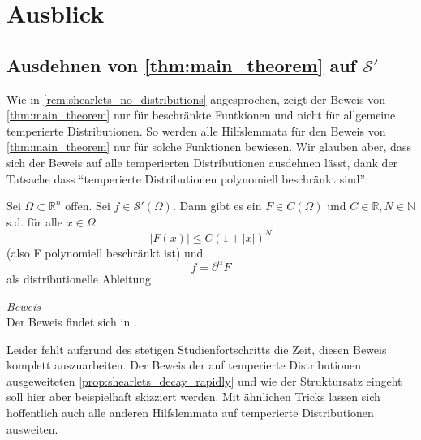 
\section{Ausblick} %
\label{sec:ausblick}

\subsection{\texorpdfstring{Ausdehnen von \cref{thm:main_theorem} auf $\mathcal{S}'$}{Ausdehnen auf Distributionen}} %
\label{sec:ausdehnen_von_thm:main_theorem}
Wie in \cref{rem:shearlets_no_distributions} angesprochen, zeigt der Beweis von \textcite{Kutyniok2008} \cref{thm:main_theorem} nur für beschränkte Funtkionen und nicht für allgemeine temperierte Distributionen. So werden alle Hilfslemmata für den Beweis von \cref{thm:main_theorem} nur für solche Funktionen bewiesen. Wir glauben aber, dass sich der Beweis auf alle temperierten Distributionen ausdehnen lässt, dank der Tatsache dass "`temperierte Distributionen polynomiell beschränkt sind"':

\begin{theorem}
\label{thm:struktursatz}
    Sei $\Omega \subset \mathbb{R}^n$ offen. Sei $f \in \mathcal{S}'(\Omega)$. Dann gibt es ein $F \in C(\Omega)$ und $C \in \mathbb{R}, N \in \mathbb{N}$ s.d. für alle $x \in \Omega$
    \begin{equation*}
        |F(x)| \leq C (1+|x| )^N
    \end{equation*}
    (also F polynomiell beschränkt ist) und
    \begin{equation*}
        f = \partial^\alpha F
    \end{equation*}
    als distributionelle Ableitung

    \emph{Beweis} \\[.5em]
    Der Beweis findet sich in \textcite[S. 97]{Friedlander1998}.
\end{theorem}


Leider fehlt aufgrund des stetigen Studienfortschritts die Zeit, diesen Beweis komplett auszuarbeiten. Der Beweis der auf temperierte Distributionen ausgeweiteten \cref{prop:shearlets_decay_rapidly} und wie der Struktursatz eingeht soll hier aber beispielhaft skizziert werden.  Mit ähnlichen Tricks lassen sich hoffentlich auch alle anderen Hilfslemmata auf temperierte Distributionen ausweiten.

